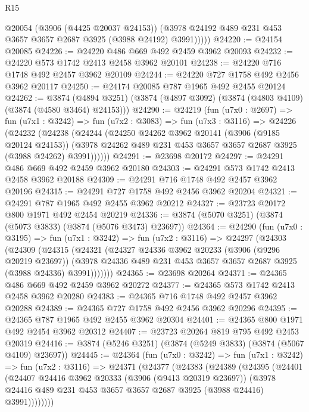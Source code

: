 \begin{lexlean}{R15}
\begin{coremodule}
            @20054
            (@3906 (@4425 @20037 @24153))
            (@3978 @24192 @489 @231 @453 @3657 @3657 @2687 @3925 (@3988 @24192) @3991)))))
@24220 := @24154 @20085
@24226 := @24220 @486 @669 @492 @2459 @3962 @20093
@24232 := @24220 @573 @1742 @2413 @2458 @3962 @20101
@24238 := @24220 @716 @1748 @492 @2457 @3962 @20109
@24244 := @24220 @727 @1758 @492 @2456 @3962 @20117
@24250 := @24174 @20085 @787 @1965 @492 @2455 @20124
@24262 := @3874
    (@4894 @3251)
    (@3874 (@4897 @3092) (@3874 (@4803 @4109) (@3874 (@4580 @3464) @24153)))
@24290 := @24219
    (fun (u7x0 : @2697) =>
    fun (u7x1 : @3242) =>
    fun (u7x2 : @3083) =>
    fun (u7x3 : @3116) =>
    @24226
      (@24232
        (@24238
          (@24244
            (@24250
              @24262
              @3962
              @20141
              (@3906 (@9185 @20124 @24153))
              (@3978 @24262 @489 @231 @453 @3657 @3657 @2687 @3925 (@3988 @24262) @3991))))))
@24291 := @23698 @20172
@24297 := @24291 @486 @669 @492 @2459 @3962 @20180
@24303 := @24291 @573 @1742 @2413 @2458 @3962 @20188
@24309 := @24291 @716 @1748 @492 @2457 @3962 @20196
@24315 := @24291 @727 @1758 @492 @2456 @3962 @20204
@24321 := @24291 @787 @1965 @492 @2455 @3962 @20212
@24327 := @23723 @20172 @800 @1971 @492 @2454 @20219
@24336 := @3874 (@5070 @3251) (@3874 (@5073 @3833) (@3874 (@5076 @3473) @23697))
@24364 := @24290
    (fun (u7x0 : @3195) =>
    fun (u7x1 : @3242) =>
    fun (u7x2 : @3116) =>
    @24297
      (@24303
        (@24309
          (@24315
            (@24321
              (@24327
                @24336
                @3962
                @20233
                (@3906 (@9296 @20219 @23697))
                (@3978 @24336 @489 @231 @453 @3657 @3657 @2687 @3925 (@3988 @24336) @3991)))))))
@24365 := @23698 @20264
@24371 := @24365 @486 @669 @492 @2459 @3962 @20272
@24377 := @24365 @573 @1742 @2413 @2458 @3962 @20280
@24383 := @24365 @716 @1748 @492 @2457 @3962 @20288
@24389 := @24365 @727 @1758 @492 @2456 @3962 @20296
@24395 := @24365 @787 @1965 @492 @2455 @3962 @20304
@24401 := @24365 @800 @1971 @492 @2454 @3962 @20312
@24407 := @23723 @20264 @819 @795 @492 @2453 @20319
@24416 := @3874 (@5246 @3251) (@3874 (@5249 @3833) (@3874 (@5067 @4109) @23697))
@24445 := @24364
    (fun (u7x0 : @3242) =>
    fun (u7x1 : @3242) =>
    fun (u7x2 : @3116) =>
    @24371
      (@24377
        (@24383
          (@24389
            (@24395
              (@24401
                (@24407
                  @24416
                  @3962
                  @20333
                  (@3906 (@9413 @20319 @23697))
                  (@3978 @24416 @489 @231 @453 @3657 @3657 @2687 @3925 (@3988 @24416) @3991))))))))

\end{coremodule}
\end{lexlean}
